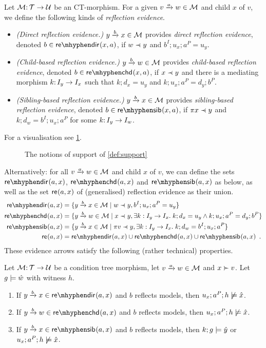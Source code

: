 \begin{definition}\label{def:support}
Let ${\mathcal{M}}{:}\, {\mathcal{T}}\rightarrow{\mathcal{U}}$ be an CT-morphism. For a given $\trip vaw\in\cM$ and child $x$ of $v$, we define the following kinds of \emph{reflection evidence}.
\begin{itemize}[topsep=\smallskipamount]
\item \emph{(Direct reflection evidence.)} $\trip ybx\in\cM$ provides \emph{direct reflection evidence}, denoted $\issdir b{x,a}$, if $w\parentof y$ and $b^I;u_x;a^P=u_y$.
\item \emph{(Child-based reflection evidence.)} $\trip ybw\in\cM$ provides \emph{child-based reflection evidence}, denoted $\isschd b{x,a}$, if $x\parentof y$ and there is a mediating morphism $k{:}\, I_y\rightarrow I_x$ such that $k;d_x=u_y$ and $k;u_x;a^P=d_y;b^P$.
\item \emph{(Sibling-based reflection evidence.)} $\trip ybx\in\cM$  provides \emph{sibling-based reflection evidence}, denoted $\isssib b{x,a}$, if $\parent x\parentof y$ and $k;d_w=b^I;u_x;a^P$ for some $k{:}\, I_y\rightarrow I_w$.
\end{itemize}
\end{definition}
%
For a visualisation see \cref{fig:source-support}.
%
\begin{figure}
	
	\caption{The notions of support of \cref{def:support}}
	\label{fig:source-support}
\end{figure}
%
Alternatively: for all $\trip vaw\in\cM$ and child $x$ of $v$, we can define the sets $\sdir{a,x}$, $\schd{a,x}$ and $\ssib{a,x}$ as below, as well as the set $\mathsf{re}_{}(a,x)$ of (generalised) reflection evidence as their union.
%
\begin{align*}
\sdir{a,x} ={} & \gensetof{\trip ybx\in \cM}{w\parentof y, b^I;u_x;a^P=u_y} \\
\schd{a,x} ={} & \gensetof{\trip ybw\in \cM}{x\parentof y, \exists k:I_y\to I_x\st k;d_x=u_y\wedge k;u_x;a^P=d_y;b^P} \\
\ssib{a,x} ={} & \gensetof{\trip ybx\in \cM}{\parent v\parentof y, \exists k:I_y\to I_x\st k;d_w=b^I;u_x;a^P} \\
\re{a,x} ={} & \sdir{a,x}\cup \schd{a,x} \cup \ssib{a,x} \enspace.
\end{align*}
%
These evidence arrows satisfy the following (rather technical) properties.
%
\begin{lemma}\label{lem:evidence}
Let  ${\mathcal{M}}{:}\, {\mathcal{T}}\rightarrow{\mathcal{U}}$ be a condition tree morphism, let $\trip vaw\in\cM$ and $x\childof v$. Let $g\models \hat w$ with witness $h$.
\begin{enumerate}
\item If $\trip ybx\in \sdir{a,x}$ and $b$ reflects models, then $u_x;a^P;h\not\models \hat x$.
\item If $\trip ybw\in \schd{a,x}$ and $b$ reflects models, then $u_x;a^P;h\not\models \hat x$.
\item If $\trip ybx\in \ssib{a,x}$ and $b$ reflects models, then $k;g\models \hat y$ or $u_x;a^P;h\not\models \hat x$.
\end{enumerate}
\end{lemma}
